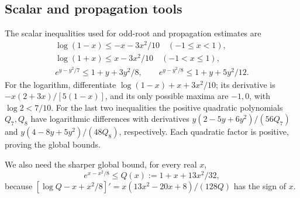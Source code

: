 
\subsection{Scalar and propagation tools}\label{calc:logtools}
The scalar inequalities used for odd-root and propagation estimates are
\begin{equation}\label{eq:compact-log-tools}
 \begin{gathered}
 \log(1-x)\le-x-3x^2/10\quad(-1\le x<1),\\
 \log(1+x)\le x-3x^2/10\quad(-1<x\le1),\\
 e^{y-y^2/7}\le1+y+3y^2/8,\qquad e^{y-y^2/8}\le1+y+5y^2/12.
 \end{gathered}
\end{equation}
For the logarithm, differentiate
$\log(1-x)+x+3x^2/10$; its derivative is $-x(2+3x)/[5(1-x)]$,
and its only possible maxima are $-1,0$, with $\log2<7/10$.
For the last two inequalities the positive quadratic polynomials $Q_7,Q_8$
have logarithmic differences with derivatives
$y(2-5y+6y^2)/(56Q_7)$ and $y(4-8y+5y^2)/(48Q_8)$,
respectively. Each quadratic factor is positive, proving the global bounds.

We also need the sharper global bound, for every real $x$,
\begin{equation}\label{eq:shared-exp-eighth}
 e^{x-x^2/8}\le Q(x):=1+x+13x^2/32,
\end{equation}
because $[\log Q-x+x^2/8]'=x(13x^2-20x+8)/(128Q)$ has the sign of $x$.


